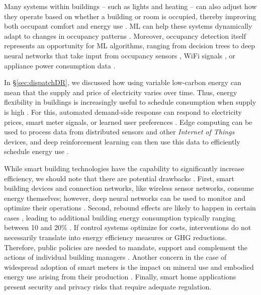 \documentclass[11pt]{report}
\begin{document}
Many systems within buildings -- such as lights and heating -- can also adjust how they operate based on whether a building or room is occupied, thereby improving both occupant comfort and energy use \cite{park2019lightlearn}. ML can help these systems dynamically adapt to changes in occupancy patterns \cite{rashidi2009keeping}. Moreover, occupancy detection itself represents an opportunity for ML algorithms, ranging from decision trees \cite{d2015occupancy,zhao_occupant_2014} to deep neural networks \cite{zou2018towards} that take input from occupancy sensors \cite{d2015occupancy}, WiFi signals \cite{zou2018towards,zou2019unsupervised}, or appliance power consumption data \cite{zhao_occupant_2014}.

In \S\ref{sec:dispatchDR}, we discussed how using variable low-carbon energy can mean that the supply and price of electricity varies over time. Thus, energy flexibility in buildings is increasingly useful to schedule consumption when supply is high \cite{riekstin2018time}.  For this, automated demand-side response \cite{hu2013hardware} can respond to electricity prices, smart meter signals, or learned user preferences \cite{JIN20171583}. Edge computing can be used to process data from distributed sensors and other \emph{Internet of Things} devices, and deep reinforcement learning can then use this data to efficiently schedule energy use \cite{liu2019intelligent}.

While smart building technologies have the capability to significantly increase efficiency, we should note that there are potential drawbacks \cite{hittinger2019internet}. First, smart building devices and connection networks, like wireless sensor networks, consume energy themselves; however, deep neural networks can be used to monitor and optimize their operations \cite{ateeq2019multi}.  Second, rebound effects are likely to happen in certain cases \cite{azevedo2014consumer}, leading to additional building energy consumption typically ranging between 10 and 20\% \cite{rau2018cross}. If control systems optimize for costs, interventions do not necessarily translate into energy efficiency measures or GHG reductions. Therefore, public policies are needed to mandate, support and complement the actions of individual building managers \cite{lucon_buildings_2014}.
Another concern in the case of widespread adoption of smart meters is the impact on mineral use and embodied energy use arising from their production \cite{sias2017characterization}. 
Finally, smart home applications present security and privacy risks \cite{couldry2019data} that require adequate regulation.
\end{document}

